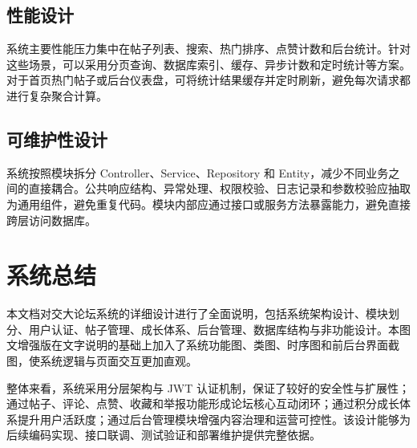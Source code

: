 \documentclass[UTF8,a4paper,12pt]{ctexart}
\begin{document}
\subsection{性能设计}

系统主要性能压力集中在帖子列表、搜索、热门排序、点赞计数和后台统计。针对这些场景，可以采用分页查询、数据库索引、缓存、异步计数和定时统计等方案。对于首页热门帖子或后台仪表盘，可将统计结果缓存并定时刷新，避免每次请求都进行复杂聚合计算。

\subsection{可维护性设计}

系统按照模块拆分 Controller、Service、Repository 和 Entity，减少不同业务之间的直接耦合。公共响应结构、异常处理、权限校验、日志记录和参数校验应抽取为通用组件，避免重复代码。模块内部应通过接口或服务方法暴露能力，避免直接跨层访问数据库。

\section{系统总结}

本文档对交大论坛系统的详细设计进行了全面说明，包括系统架构设计、模块划分、用户认证、帖子管理、成长体系、后台管理、数据库结构与非功能设计。本图文增强版在文字说明的基础上加入了系统功能图、类图、时序图和前后台界面截图，使系统逻辑与页面交互更加直观。

整体来看，系统采用分层架构与 JWT 认证机制，保证了较好的安全性与扩展性；通过帖子、评论、点赞、收藏和举报功能形成论坛核心互动闭环；通过积分成长体系提升用户活跃度；通过后台管理模块增强内容治理和运营可控性。该设计能够为后续编码实现、接口联调、测试验证和部署维护提供完整依据。
\end{document}
